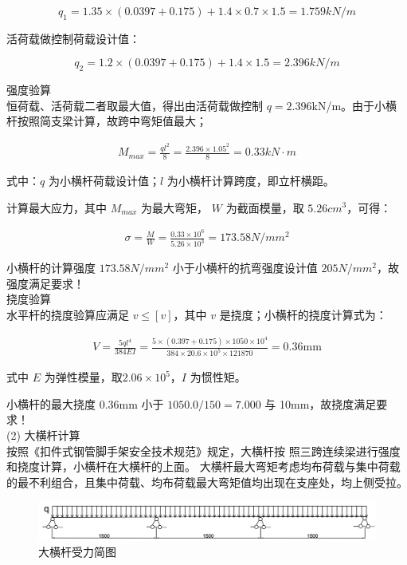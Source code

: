 $$q_1=1.35\times(0.0397+0.175)+1.4\times 0.7\times 1.5=1.759 kN/m$$

活荷载做控制荷载设计值：

$$q_2=1.2\times(0.0397+0.175)+1.4\times 1.5=2.396 kN/m$$

 强度验算\\

恒荷载、活荷载二者取最大值，得出由活荷载做控制 $q=2.396 $kN/m。由于小横杆按照简支梁计算，故跨中弯矩值最大；

\begin{align}
    M_{max}=\frac{ql^2}{8}=\frac{2.396\times 1.05^2}{8}=0.33 kN\cdot m
\end{align}

式中：$q$ 为小横杆荷载设计值；$l$ 为小横杆计算跨度，即立杆横距。

计算最大应力，其中 $M_{max}$ 为最大弯矩， $W$ 为截面模量，取 $5.26 cm^3$，可得：

\begin{align}
    \label{fx:load}
    \sigma =\frac{M}{W}=\frac{0.33\times 10^6}{5.26\times10^3}=173.58N/mm^2
\end{align}

小横杆的计算强度 $173.58N/mm^2$ 小于小横杆的抗弯强度设计值 $205N/mm^2$，故强度满足要求！\\

 挠度验算\\

水平杆的挠度验算应满足 $v\leq [v] $，其中 $v$ 是挠度；小横杆的挠度计算式为：

\begin{align}
    V=\frac{5ql^4}{384EI}=\frac{5\times (0.397+0.175)\times 1050\times 10^4}{384\times 20.6\times 10^5\times 121870}=0.36 \text{mm}
\end{align}

式中 $E$ 为弹性模量，取$2.06\times 10^5$，$I$ 为惯性矩。

小横杆的最大挠度 0.36mm 小于 $1050.0/150=7.000$ 与 10mm，故挠度满足要求！ \\

(2) 大横杆计算\\

按照《扣件式钢管脚手架安全技术规范》规定，大横杆按
照三跨连续梁进行强度和挠度计算，小横杆在大横杆的上面。
大横杆最大弯矩考虑均布荷载与集中荷载的最不利组合，且集中荷载、均布荷载最大弯矩值均出现在支座处，均上侧受拉。\\

\begin{figure}[thbp!]
    \centering
    \includegraphics[width=1.0\linewidth]{figure/c4f2.png}
    \caption{大横杆受力简图}
    \label{fig:c4f2}
\end{figure}


